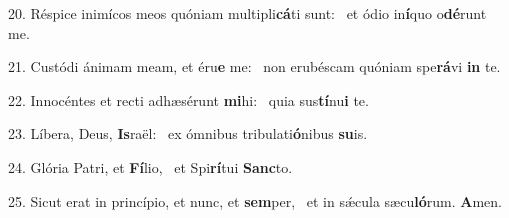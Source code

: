20. Réspice inimícos meos quóniam multipli\textbf{cá}ti sunt: \ast\  et ódio in\textbf{í}quo o\textbf{dé}runt me.\

21. Custódi ánimam meam, et éru\textbf{e} me: \ast\  non erubéscam quóniam spe\textbf{rá}vi \textbf{in} te.\

22. Innocéntes et recti adhæsérunt \textbf{mi}hi: \ast\  quia sus\textbf{tí}nu\textbf{i} te.\

23. Líbera, Deus, \textbf{Is}raël: \ast\  ex ómnibus tribulati\textbf{ó}nibus \textbf{su}is.\

24. Glória Patri, et \textbf{Fí}lio, \ast\  et Spi\textbf{rí}tui \textbf{Sanc}to.\

25. Sicut erat in princípio, et nunc, et \textbf{sem}per, \ast\  et in sǽcula sæcu\textbf{ló}rum. \textbf{A}men.\

